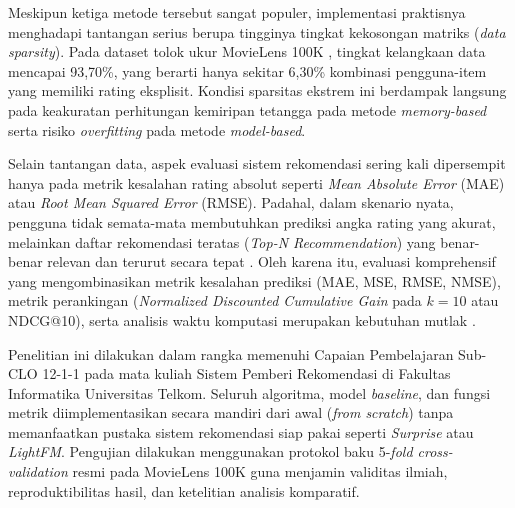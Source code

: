 Meskipun ketiga metode tersebut sangat populer, implementasi praktisnya menghadapi tantangan serius berupa tingginya tingkat kekosongan matriks (\textit{data sparsity}). Pada dataset tolok ukur MovieLens 100K \citep{harper2015movielens}, tingkat kelangkaan data mencapai 93,70\%, yang berarti hanya sekitar 6,30\% kombinasi pengguna-item yang memiliki rating eksplisit. Kondisi sparsitas ekstrem ini berdampak langsung pada keakuratan perhitungan kemiripan tetangga pada metode \textit{memory-based} serta risiko \textit{overfitting} pada metode \textit{model-based}.

Selain tantangan data, aspek evaluasi sistem rekomendasi sering kali dipersempit hanya pada metrik kesalahan rating absolut seperti \textit{Mean Absolute Error} (MAE) atau \textit{Root Mean Squared Error} (RMSE). Padahal, dalam skenario nyata, pengguna tidak semata-mata membutuhkan prediksi angka rating yang akurat, melainkan daftar rekomendasi teratas (\textit{Top-N Recommendation}) yang benar-benar relevan dan terurut secara tepat \citep{jarvelin2002cumulated}. Oleh karena itu, evaluasi komprehensif yang mengombinasikan metrik kesalahan prediksi (MAE, MSE, RMSE, NMSE), metrik perankingan (\textit{Normalized Discounted Cumulative Gain} pada $k=10$ atau NDCG@10), serta analisis waktu komputasi merupakan kebutuhan mutlak \citep{baizal2024recsys}.

Penelitian ini dilakukan dalam rangka memenuhi Capaian Pembelajaran Sub-CLO 12-1-1 pada mata kuliah Sistem Pemberi Rekomendasi di Fakultas Informatika Universitas Telkom. Seluruh algoritma, model \textit{baseline}, dan fungsi metrik diimplementasikan secara mandiri dari awal (\textit{from scratch}) tanpa memanfaatkan pustaka sistem rekomendasi siap pakai seperti \textit{Surprise} atau \textit{LightFM}. Pengujian dilakukan menggunakan protokol baku 5-\textit{fold cross-validation} resmi pada MovieLens 100K guna menjamin validitas ilmiah, reproduktibilitas hasil, dan ketelitian analisis komparatif.

